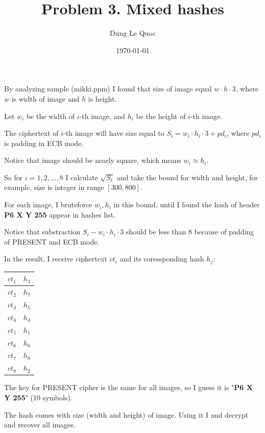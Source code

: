 \documentclass{article}
\title{Problem 3. Mixed hashes}
\author{Dung Le Quoc}
\date{\today}
\begin{document}
\maketitle

By analyzing sample (mikki.ppm) I found that size of image equal $w \cdot h \cdot 3$, where $w$ is width of image and $h$ is height.

Let $w_i$ be the width of $i$-th image, and $h_i$ be the height of $i$-th image.

The ciphertext of $i$-th image will have size equal to $S_i = w_i \cdot h_i \cdot 3 + pd_i$, where $pd_i$ is padding in ECB mode.

Notice that image should be nearly square, which means $w_i \approx h_i$.

So for $i=1, 2, \ldots, 8$ I calculate $\sqrt{S_i}$ and take the bound for width and height, for example, size is integer in range $[300, 800]$.

For each image, I bruteforce $w_i, h_i$ in this bound, until I found the hash of header \textbf{P6 X Y 255} appear in hashes list.

Notice that substraction $S_i - w_i \cdot h_i \cdot 3$ should be less than 8 because of padding of PRESENT and ECB mode.

In the result, I receive ciphertext $ct_i$ and its coressponding hash $h_j$:

\begin{table}[ht]
    \centering
    \begin{tabular}{|c|c|}
        \hline
        $ct_1$ & $h_3$ \\ \hline
        $ct_2$ & $h_7$ \\ \hline
        $ct_3$ & $h_5$ \\ \hline
        $ct_4$ & $h_4$ \\ \hline
        $ct_5$ & $h_1$ \\ \hline
        $ct_6$ & $h_6$ \\ \hline
        $ct_7$ & $h_8$ \\ \hline
        $ct_8$ & $h_2$ \\ \hline        
    \end{tabular}
\end{table}

The key for PRESENT cipher is the same for all images, so I guess it is "\textbf{P6 X Y 255}" (10 symbols).

The hash comes with size (width and height) of image. Using it I and decrypt and recover all images.
\end{document}
